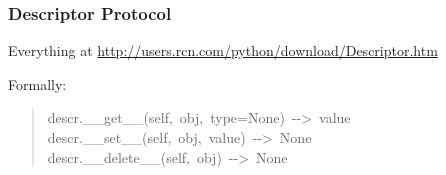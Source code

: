 \documentclass[10pt,a4paper,english]{article}
\begin{document}

\hypertarget{descriptor-protocol}{}
\subsubsection*{Descriptor Protocol}

Everything at \href{http://users.rcn.com/python/download/Descriptor.htm}{http://users.rcn.com/python/download/Descriptor.htm}

Formally:
\begin{quote}{\ttfamily \raggedright \noindent
descr.{\_}{\_}get{\_}{\_}(self,~obj,~type=None)~-{}->~value~\\
descr.{\_}{\_}set{\_}{\_}(self,~obj,~value)~-{}->~None~\\
descr.{\_}{\_}delete{\_}{\_}(self,~obj)~-{}->~None
}\end{quote}
\end{document}
